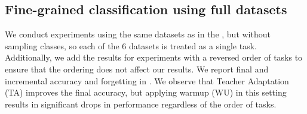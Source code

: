 \begin{appendix}
\subsection{Fine-grained classification using full datasets}
\label{sec:app:fg_full}
We conduct experiments using the same datasets as in the , but without sampling classes, so each of the 6 datasets is treated as a single task. Additionally, we add the results for experiments with a reversed order of tasks to ensure that the ordering does not affect our results. We report final and incremental accuracy and forgetting in . We observe that Teacher Adaptation (TA) improves the final accuracy, but applying warmup (WU) in this setting results in significant drops in performance regardless of the order of tasks.

\begin{table*}
\centering
{}
\caption{Additional results for training on full fine-grained datasets in standard and reversed order.}
\label{tab:app:full_fg}
\end{table*}


\end{appendix}
